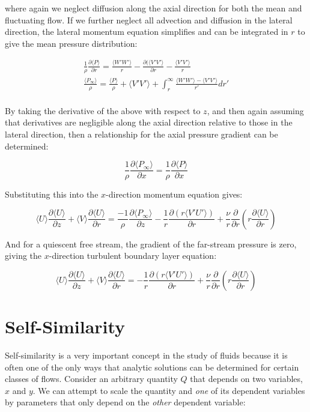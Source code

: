 \documentclass[10pt]{article}
\newcommand{\beq}{\begin{equation}}
\newcommand{\eeq}{\end{equation}}
\newcommand{\beqa}{\begin{equation}\begin{aligned}}
\newcommand{\eeqa}{\end{aligned}\end{equation}}
\newcommand{\la}{\langle}
\newcommand{\ra}{\rangle}
\begin{document}
\begin{flushleft}
where again we neglect diffusion along the axial direction for both the mean and fluctuating flow. If we further neglect all advection and diffusion in the lateral direction, the lateral momentum equation simplifies and can be integrated in \(r\) to give the mean pressure distribution:

\beqa
\frac{1}{\rho}\frac{\partial \la P\ra}{\partial r}=\frac{\la W'W'\ra}{r}-\frac{\partial(\la V'V'\ra}{\partial r}-\frac{\la V'V'\ra}{r}\\
\frac{\la P_{\infty}\ra}{\rho}=\frac{\la P\ra}{\rho}+\la V'V'\ra+\int_{r}^{\infty}\frac{\la W'W'\ra - \la V'V'\ra}{r'}dr'\\
\eeqa

By taking the derivative of the above with respect to \(z\), and then again assuming that derivatives are negligible along the axial direction relative to those in the lateral direction, then a relationship for the axial pressure gradient can be determined:

\beq
\frac{1}{\rho}\frac{\partial\la P_{\infty}\ra}{\partial x}=\frac{1}{\rho}\frac{\partial\la P\ra}{\partial x}
\eeq

Substituting this into the \(x\)-direction momentum equation gives:

\beq
\la U\ra\frac{\partial \la U\ra}{\partial z}+\la V\ra\frac{\partial \la U\ra}{\partial r}=\frac{-1}{\rho}\frac{\partial \la P_{\infty}\ra}{\partial z}-\frac{1}{r}\frac{\partial (r\la V'U'\ra)}{\partial r}+\frac{\nu}{r}\frac{\partial}{\partial r}\left(r\frac{\partial\la U\ra}{\partial r}\right)
\eeq

And for a quiescent free stream, the gradient of the far-stream pressure is zero, giving the \(x\)-direction turbulent boundary layer equation:

\beq
\label{eq:BLEx}
\la U\ra\frac{\partial \la U\ra}{\partial z}+\la V\ra\frac{\partial \la U\ra}{\partial r}=-\frac{1}{r}\frac{\partial (r\la V'U'\ra)}{\partial r}+\frac{\nu}{r}\frac{\partial}{\partial r}\left(r\frac{\partial\la U\ra}{\partial r}\right)
\eeq









\section{Self-Similarity}
Self-similarity is a very important concept in the study of fluids because it is often one of the only ways that  analytic solutions can be determined for certain classes of flows. Consider an arbitrary quantity \(Q\) that depends on two variables, \(x\) and \(y\). We can attempt to scale the quantity and \textit{one} of its dependent variables by parameters that only depend on the \textit{other} dependent variable:


\end{flushleft}
\end{document}
